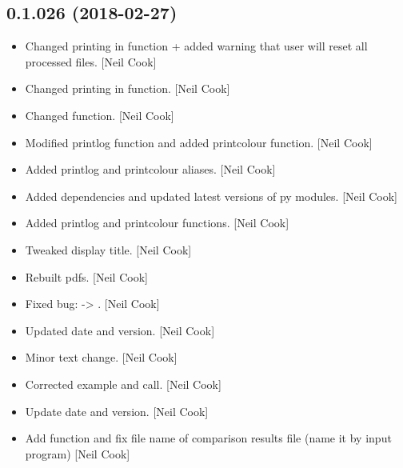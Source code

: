 \documentclass[a4paper,10pt,english]{report}
\begin{document}
\subsection{0.1.026 (2018-02-27)}
\label{\detokenize{misc/changelog:id478}}\begin{itemize}
\item {} 
Changed printing in function + added warning that user will reset all
processed files. {[}Neil Cook{]}

\item {} 
Changed printing in function. {[}Neil Cook{]}

\item {} 
Changed  function. {[}Neil Cook{]}

\item {} 
Modified printlog function and added printcolour function. {[}Neil Cook{]}

\item {} 
Added printlog and printcolour aliases. {[}Neil Cook{]}

\item {} 
Added dependencies and updated latest versions of py modules. {[}Neil
Cook{]}

\item {} 
Added printlog and printcolour functions. {[}Neil Cook{]}

\item {} 
Tweaked display title. {[}Neil Cook{]}

\item {} 
Rebuilt pdfs. {[}Neil Cook{]}

\item {} 
Fixed bug:  -\textgreater{} . {[}Neil Cook{]}

\item {} 
Updated date and version. {[}Neil Cook{]}

\item {} 
Minor text change. {[}Neil Cook{]}

\item {} 
Corrected  example and call. {[}Neil Cook{]}

\item {} 
Update date and version. {[}Neil Cook{]}

\item {} 
Add  function and fix file name of comparison results
file (name it by input program) {[}Neil Cook{]}


\end{itemize}
\end{document}
